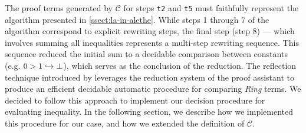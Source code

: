 The proof terms generated by $\mathcal{C}$ for steps \texttt{t2} and \texttt{t5} must faithfully represent the algorithm presented in \cref{ssect:la-in-alethe}.
While steps 1 through 7 of the algorithm correspond to explicit rewriting steps, the final step (step 8) — which involves summing all inequalities represents a multi-step rewriting sequence.
This sequence reduced the initial sum to a decidable comparison between constants (e.g. $0 > 1 \hookrightarrow \bot$), which serves as the conclusion of the reduction.
%
The reflection technique introduced by \cite{reflection-origin-coq} leverages the reduction system of the proof assistant to produce an efficient decidable automatic
procedure for comparing \emph{Ring} terms. We decided to follow this approach to implement our decision procedure for evaluating inequality.
In the following section, we describe how we implemented this procedure for our case, and how we extended the definition of $\mathcal{C}$.